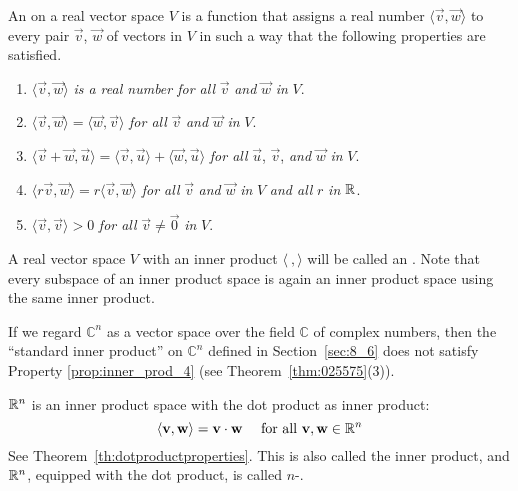 \documentclass{ximera}
\begin{document}
\begin{definition}\label{def:innerproductspace}
An  on a real vector space $V$ is a function that assigns a real number $\langle\vec{v}, \vec{w}\rangle$ to every pair $\vec{v}$, $\vec{w}$ of vectors in $V$ in such a way that the following properties are satisfied.

\begin{enumerate}
\item\label{prop:inner_prod_1}  $\langle\vec{v}, \vec{w}\rangle$ \textit{is a real number for all} $\vec{v}$ \textit{and} $\vec{w}$ \textit{in} $V$.

\item\label{prop:inner_prod_2}  $\langle\vec{v}, \vec{w}\rangle = \langle\vec{w}, \vec{v}\rangle$ \textit{for all} $\vec{v}$ \textit{and} $\vec{w}$ \textit{in} $V$.

\item\label{prop:inner_prod_3}  $\langle\vec{v} + \vec{w}, \vec{u}\rangle = \langle\vec{v}, \vec{u}\rangle + \langle\vec{w}, \vec{u}\rangle$ \textit{for all} $\vec{u}$, $\vec{v}$, \textit{and} $\vec{w}$ \textit{in} $V$.

\item\label{prop:inner_prod_4} $\langle r\vec{v}, \vec{w}\rangle = r\langle\vec{v}, \vec{w}\rangle$ \textit{for all} $\vec{v}$ \textit{and} $\vec{w}$ \textit{in} $V$ \textit{and all} $r$ \textit{in} $\mathbb{R}$.

\item\label{prop:inner_prod_5}  $\langle\vec{v}, \vec{v}\rangle > 0$ \textit{for all} $\vec{v} \neq \vec{0}$ \textit{in} $V$.

\end{enumerate}
\end{definition}
A real vector space $V$ with an inner product $\langle\ , \rangle$ will be called an .  Note that every subspace of an inner product space is again an inner product space using the same inner product.
\begin{remark}
    If we regard $\mathbb{C}^n$ as a vector space over the field $\mathbb{C}$  of complex numbers, then the ``standard inner product'' on $\mathbb{C}^n$ defined in Section~\ref{sec:8_6} does not satisfy  Property \ref{prop:inner_prod_4} (see Theorem~\ref{thm:025575}(3)).
\end{remark}

\begin{example}\label{exa:030303}
$\mathbb{R}^n$ is an inner product space with the dot product as inner product:
\begin{equation*}
\langle \mathbf{v}, \mathbf{w} \rangle = \mathbf{v} \cdot \mathbf{w} \quad \mbox{ for all } \mathbf{v},  \mathbf{w} \in \mathbb{R}^n
\end{equation*}
See Theorem~\ref{th:dotproductproperties}. This is also called the
 inner product, and
$\mathbb{R}^n$, equipped with the dot product, is called 
$n$-.
\end{example}
\end{document}
